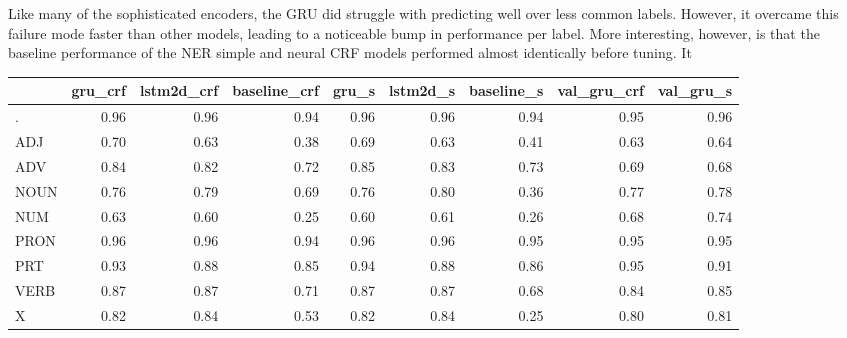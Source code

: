 \documentclass[11pt,a4paper]{article}
\begin{document}

Like many of the sophisticated encoders, the GRU did struggle with predicting well over less common labels. However, it overcame this failure mode faster than other models, leading to a noticeable bump in performance per label. More interesting, however, is that the baseline performance of the NER simple and neural CRF models performed almost identically before tuning. It 

\FloatBarrier
\begin{table}[h]
\begin{tabular}{lrrrrrrrr}
\toprule
{} &  gru\_crf &  lstm2d\_crf &  baseline\_crf &  gru\_s &  lstm2d\_s &  baseline\_s &  val\_gru\_crf &  val\_gru\_s \\
\midrule
.        &              0.96 &                 0.96 &                   0.94 &            0.96 &               0.96 &                 0.94 &             0.95 &           0.96 \\
ADJ      &              0.70 &                 0.63 &                   0.38 &            0.69 &               0.63 &                 0.41 &             0.63 &           0.64 \\
ADV      &              0.84 &                 0.82 &                   0.72 &            0.85 &               0.83 &                 0.73 &             0.69 &          0.68 \\
NOUN     &              0.76 &                 0.79 &                   0.69 &            0.76 &               0.80 &                 0.36 &             0.77 &           0.78 \\
NUM      &              0.63 &                 0.60 &                   0.25 &            0.60 &               0.61 &                 0.26 &             0.68 &           0.74 \\
PRON     &              0.96 &                 0.96 &                   0.94 &            0.96 &               0.96 &                 0.95 &             0.95 &           0.95 \\
PRT      &              0.93 &                 0.88 &                   0.85 &            0.94 &               0.88 &                 0.86 &             0.95 &           0.91 \\
VERB     &              0.87 &                 0.87 &                   0.71 &            0.87 &               0.87 &                 0.68 &             0.84 &           0.85 \\
X        &              0.82 &                 0.84 &                   0.53 &            0.82 &               0.84 &                 0.25 &             0.80 &           0.81 \\

\end{tabular}
\end{table}
\end{document}

